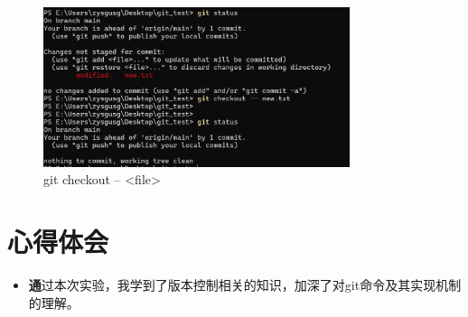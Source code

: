 \documentclass[UTF8]{ctexart}
\begin{document}
\begin{figure}[htbp]
    \centering
    \includegraphics[width=0.8\textwidth]{22.png} 
    \caption{git checkout -- <file>}
\end{figure}

\FloatBarrier %
\section{心得体会}
\begin{itemize}
    \item \textbf 通过本次实验，我学到了版本控制相关的知识，加深了对git命令及其实现机制的理解。

\end{itemize}
\end{document}
